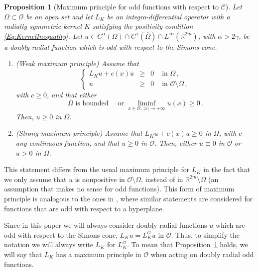 \documentclass[12pt,reqno]{amsart}
\newtheorem{proposition}[theorem]{Proposition}
\theoremstyle{definition}
\theoremstyle{remark}
\newcommand{\con}[1]{\mathbb{#1}}
\newcommand{\R}{\con{R}} %
\newcommand{\ccal}{\mathscr{C}}
\newcommand{\ocal}{\mathcal{O}}
\newcommand{\s}{\gamma}
\newcommand\beqc[1]{\left\{\begin{array}{#1}}
\newcommand\eeqc{\end{array} \right.}
\def\PDEsystem{rcll}
\numberwithin{equation}{section}
\begin{document}
\begin{proposition}[Maximum principle for odd functions with respect to $\ccal$]
	\label{Prop:MaximumPrincipleForOddFunctions} Let $\Omega \subset \ocal$ be an open set and let $L_K$ be an integro-differential operator with a radially symmetric kernel $K$ satisfying the positivity condition \eqref{Eq:KernelInequality}.  Let $u\in C^{\alpha}(\Omega)\cap C^{\s}(\overline{\Omega})\cap L^\infty(\R^{2m})$, with $\alpha > 2\s$, be a doubly radial function which is odd with respect to the Simons cone. 
	
	\begin{enumerate}[label=(\roman{*})]
		\item  (Weak maximum principle)
		Assume that
		$$
		\beqc{\PDEsystem}
		L_K u + c(x) u & \geq & 0 & \text{ in } \Omega\,,\\
		u & \geq & 0 & \text{ in } \ocal \setminus \Omega\,,
		\eeqc
		$$
		with $c \geq 0$, and that either
		$$
		\Omega \text{ is bounded} \quad \text{ or } \liminf_{x \in \ocal,\,|x|\to +\infty} u(x) \geq 0\,.
		$$
		Then, $u \geq 0$ in $\Omega$.
		
		\item (Strong maximum principle)  
		Assume that $L_K u + c(x) u\geq 0$ in $\Omega$, with $c$ any continuous function, and that $u\geq 0$ in $\ocal$. Then, either $u\equiv 0$ in $\ocal$ or $u > 0$ in $\Omega$.
	\end{enumerate} 
\end{proposition}

This statement differs from the usual maximum principle for $L_K$ in the fact that we only assume that $u$ is nonpositive in $\ocal\setminus \Omega$, instead of in $\R^{2m}\setminus \Omega$ (an assumption that makes no sense for odd functions). This form of maximum principle is analogous to the ones in \cite{ChenLiLi, JarohsWeth}, where similar statements are considered for functions that are odd with respect to a hyperplane.

Since in this paper we will always consider doubly radial functions $u$ which are odd with respect to the Simons cone, $L_K u =L_K^\ocal u$ in $\ocal$. Thus, to simplify the notation we will always write $L_K$ for $L_K^\ocal$. To mean that Proposition~\ref{Prop:MaximumPrincipleForOddFunctions} holds, we will say that $L_K$ has a maximum principle in $\ocal$ when acting on doubly radial odd functions.
\end{document}
